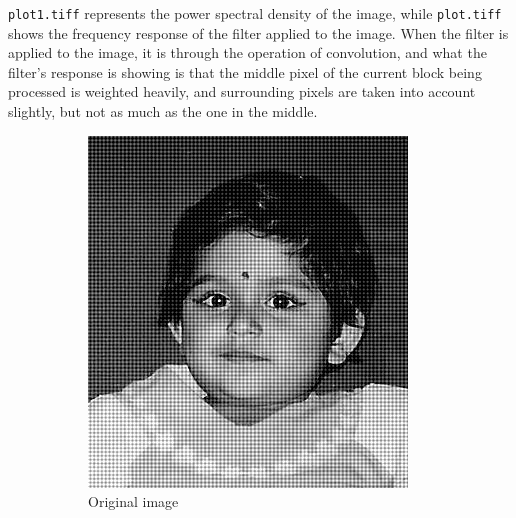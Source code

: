 \documentclass{article}
\begin{document}
\verb|plot1.tiff| represents the power spectral density of the image, while \verb|plot.tiff| shows the frequency response of the filter applied to the image. When the filter is applied to the image, it is through the operation of convolution, and what the filter's response is showing is that the middle pixel of the current block being processed is weighted heavily, and surrounding pixels are taken into account slightly, but not as much as the one in the middle.


\begin{figure}[H]
    \centering
    \begin{subfigure}[b]{0.45\textwidth}
        \centering
        \includegraphics[width=\textwidth]{ayantika.png}
        \caption{Original image}
    \end{subfigure}
    \hfill
    \begin{subfigure}[b]{0.45\textwidth}
        \centering

\end{subfigure}
\end{figure}
\end{document}
